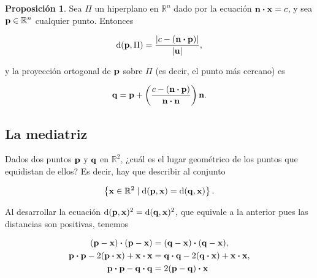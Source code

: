 \documentclass{article}
\theoremstyle{definicion}
\theoremstyle{definition}             %
\theoremstyle{definition}             %
\theoremstyle{definition}
\theoremstyle{definition}
\theoremstyle{observacion}
\theoremstyle{definition}
\newtheorem{prop}{Proposición}
\theoremstyle{plain}
\theoremstyle{definition}
\theoremstyle{afirmacion}
\theoremstyle{notation}
\theoremstyle{definition}
\begin{document}
        \begin{prop}
            Sea \(\Pi\) un hiperplano en \(\mathbb{R}^{n}\) dado por la ecuación \(\vb{n} \vdot \vb{x} = c\), y sea \(\vb{p} \in \mathbb{R}^{n}\) cualquier punto. Entonces

            \begin{equation*}
                \textrm{d}(\vb{p}, \Pi) = \dfrac{\abs{c - (\vb{n} \vdot \vb{p})}}{\abs{\vb{u}}},
            \end{equation*}

            y la proyección ortogonal de \(\vb{p}\) sobre \(\Pi\) (es decir, el punto más cercano) es

            \begin{equation*}
                \vb{q} = \vb{p} + \left(\dfrac{c - (\vb{n} \vdot \vb{p})}{\vb{n} \vdot \vb{n}}\right)\vb{n}.
            \end{equation*}
        \end{prop}

        \subsection{La mediatriz}

        Dados dos puntos \(\vb{p}\) y \(\vb{q}\) en \(\mathbb{R}^{2}\), ¿cuál es el lugar geométrico de los puntos que equidistan de ellos? Es decir, hay que describir al conjunto
        
        \begin{equation*}
            \left\lbrace\vb{x} \in \mathbb{R}^{2} \mid \textrm{d}(\vb{p}, \vb{x}) = \textrm{d}(\vb{q}, \vb{x})\right\rbrace.
        \end{equation*}

        Al desarrollar la ecuación \(\textrm{d}(\vb{p}, \vb{x})^{2} = \textrm{d}(\vb{q}, \vb{x})^{2}\), que equivale a la anterior pues las distancias son positivas, tenemos

        \begin{align*}
            (\vb{p} - \vb{x}) \vdot (\vb{p} - \vb{x}) &= (\vb{q} - \vb{x}) \vdot (\vb{q} - \vb{x}),\\
            \vb{p} \vdot \vb{p} - 2(\vb{p} \vdot \vb{x}) + \vb{x} \vdot \vb{x} &= \vb{q} \vdot \vb{q} - 2(\vb{q} \vdot \vb{x}) + \vb{x} \vdot \vb{x},\\
            \vb{p} \vdot \vb{p} - \vb{q} \vdot \vb{q} &= 2(\vb{p} - \vb{q}) \vdot \vb{x}
        \end{align*}
\end{document}
